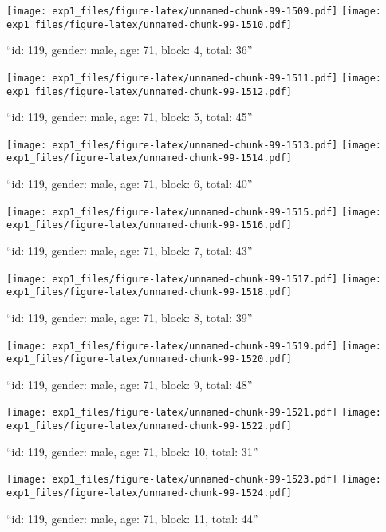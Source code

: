 \documentclass[,]{article}
\begin{document}
\texttt{[image: exp1\_files/figure-latex/unnamed-chunk-99-1509.pdf]}
\texttt{[image: exp1\_files/figure-latex/unnamed-chunk-99-1510.pdf]}

\newpage
[1] 

``id: 119, gender: male, age: 71, block: 4, total: 36''

\texttt{[image: exp1\_files/figure-latex/unnamed-chunk-99-1511.pdf]}
\texttt{[image: exp1\_files/figure-latex/unnamed-chunk-99-1512.pdf]}

\newpage
[1] 

``id: 119, gender: male, age: 71, block: 5, total: 45''

\texttt{[image: exp1\_files/figure-latex/unnamed-chunk-99-1513.pdf]}
\texttt{[image: exp1\_files/figure-latex/unnamed-chunk-99-1514.pdf]}

\newpage
[1] 

``id: 119, gender: male, age: 71, block: 6, total: 40''

\texttt{[image: exp1\_files/figure-latex/unnamed-chunk-99-1515.pdf]}
\texttt{[image: exp1\_files/figure-latex/unnamed-chunk-99-1516.pdf]}

\newpage
[1] 

``id: 119, gender: male, age: 71, block: 7, total: 43''

\texttt{[image: exp1\_files/figure-latex/unnamed-chunk-99-1517.pdf]}
\texttt{[image: exp1\_files/figure-latex/unnamed-chunk-99-1518.pdf]}

\newpage
[1] 

``id: 119, gender: male, age: 71, block: 8, total: 39''

\texttt{[image: exp1\_files/figure-latex/unnamed-chunk-99-1519.pdf]}
\texttt{[image: exp1\_files/figure-latex/unnamed-chunk-99-1520.pdf]}

\newpage
[1] 

``id: 119, gender: male, age: 71, block: 9, total: 48''

\texttt{[image: exp1\_files/figure-latex/unnamed-chunk-99-1521.pdf]}
\texttt{[image: exp1\_files/figure-latex/unnamed-chunk-99-1522.pdf]}

\newpage
[1] 

``id: 119, gender: male, age: 71, block: 10, total: 31''

\texttt{[image: exp1\_files/figure-latex/unnamed-chunk-99-1523.pdf]}
\texttt{[image: exp1\_files/figure-latex/unnamed-chunk-99-1524.pdf]}

\newpage
[1] 

``id: 119, gender: male, age: 71, block: 11, total: 44''
\end{document}
